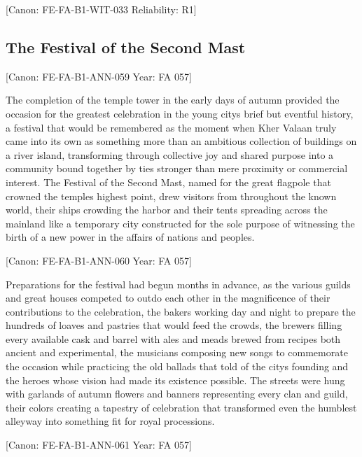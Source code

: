 {[}Canon: FE-FA-B1-WIT-033 \textbar{} Reliability: R1{]}

\subsection{The Festival of the Second
Mast}\label{the-festival-of-the-second-mast}

{[}Canon: FE-FA-B1-ANN-059 \textbar{} Year: FA 057{]}

The completion of the temple tower in the early days of autumn provided
the occasion for the greatest celebration in the young
city\textquotesingle s brief but eventful history, a festival that would
be remembered as the moment when Kher Valaan truly came into its own as
something more than an ambitious collection of buildings on a river
island, transforming through collective joy and shared purpose into a
community bound together by ties stronger than mere proximity or
commercial interest. The Festival of the Second Mast, named for the
great flagpole that crowned the temple\textquotesingle s highest point,
drew visitors from throughout the known world, their ships crowding the
harbor and their tents spreading across the mainland like a temporary
city constructed for the sole purpose of witnessing the birth of a new
power in the affairs of nations and peoples.

{[}Canon: FE-FA-B1-ANN-060 \textbar{} Year: FA 057{]}

Preparations for the festival had begun months in advance, as the
various guilds and great houses competed to outdo each other in the
magnificence of their contributions to the celebration, the bakers
working day and night to prepare the hundreds of loaves and pastries
that would feed the crowds, the brewers filling every available cask and
barrel with ales and meads brewed from recipes both ancient and
experimental, the musicians composing new songs to commemorate the
occasion while practicing the old ballads that told of the
city\textquotesingle s founding and the heroes whose vision had made its
existence possible. The streets were hung with garlands of autumn
flowers and banners representing every clan and guild, their colors
creating a tapestry of celebration that transformed even the humblest
alleyway into something fit for royal processions.

{[}Canon: FE-FA-B1-ANN-061 \textbar{} Year: FA 057{]}

